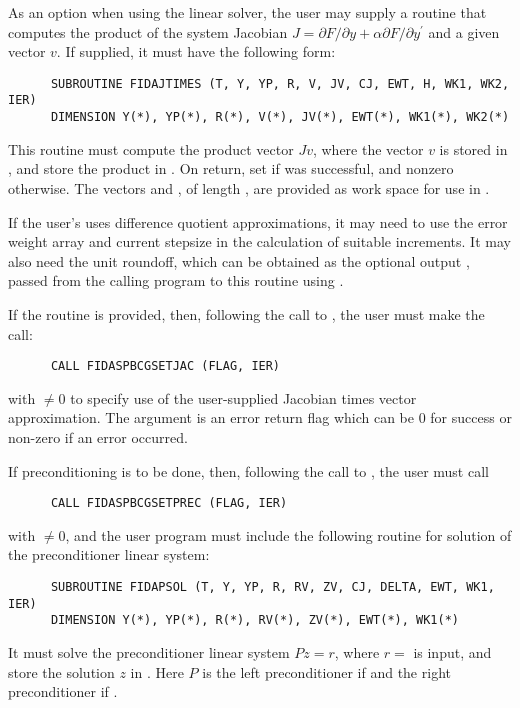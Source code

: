 \begin{Steps}
  As an option when using the {\spbcg} linear solver, the user may supply a 
  routine that computes the product of the system Jacobian
  $J = \partial F / \partial y + \alpha \partial F / \partial y^\prime$
  and a given vector $v$.  If supplied, it must have the following form:
\begin{verbatim}
      SUBROUTINE FIDAJTIMES (T, Y, YP, R, V, JV, CJ, EWT, H, WK1, WK2, IER)
      DIMENSION Y(*), YP(*), R(*), V(*), JV(*), EWT(*), WK1(*), WK2(*)
\end{verbatim}
  This routine must compute the product vector $Jv$, where the vector $v$ is
  stored in , and store the product in .  On return, set
   if  was successful, and nonzero otherwise.
  The vectors  and , of length , are
  provided as work space for use in .

  If the user's  uses difference quotient approximations, it
  may need to use the error weight array  and current stepsize 
  in the calculation of suitable increments.  It may also need the unit
  roundoff, which can be obtained as the optional output ,
  passed from the calling program to this routine using .

  If the  routine is provided, then, 
  following the call to , the user must make the call:
\begin{verbatim}
      CALL FIDASPBCGSETJAC (FLAG, IER)
\end{verbatim}
  with  $\neq 0$ to specify use of the user-supplied Jacobian times
  vector approximation.
  The argument  is an error return flag which can be $0$ 
  for success or non-zero if an error occurred.
  
  If preconditioning is to be done, then, following the
  call to , the user must call
\begin{verbatim}
      CALL FIDASPBCGSETPREC (FLAG, IER)
\end{verbatim}
  with  $\neq 0$, and the user program must include the following routine
  for solution of the preconditioner linear system:
\begin{verbatim}
      SUBROUTINE FIDAPSOL (T, Y, YP, R, RV, ZV, CJ, DELTA, EWT, WK1, IER)
      DIMENSION Y(*), YP(*), R(*), RV(*), ZV(*), EWT(*), WK1(*)
\end{verbatim}
  It must solve the preconditioner linear system $Pz = r$, where $r =$  
  is input, and store the solution $z$ in . Here $P$ is the left 
  preconditioner if  and the right preconditioner if .
  

\end{Steps}
